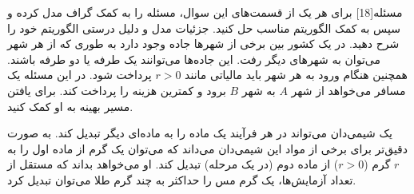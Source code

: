 ‌مسئله[18]
برای هر یک از قسمت‌های این سوال، مسئله را به کمک گراف مدل کرده و سپس به کمک الگوریتم مناسب حل کنید. جزئیات مدل و دلیل درستی الگوریتم خود را شرح دهید.
در یک کشور بین برخی از شهر‌ها جاده وجود دارد به طوری که از هر شهر می‌توان به شهر‌های دیگر رفت. این جاده‌ها می‌توانند یک طرفه یا دو طرفه باشند. همچنین هنگام ورود به هر شهر باید  مالیاتی  مانند $r > 0$    پرداخت شود. در این مسئله یک مسافر می‌خواهد از شهر $A$  به شهر $B$ برود و    کمترین هزینه را پرداخت کند. برای یافتن مسیر بهینه به او کمک کنید.




یک شیمی‌دان می‌تواند در هر فرآیند یک ماده را به ماده‌ای دیگر تبدیل کند. به صورت دقیق‌تر برای برخی از مواد این شیمی‌دان می‌داند که می‌توان یک گرم از ماده اول را به 
$r$
گرم ($r > 0$) از ماده دوم (در یک مرحله) تبدیل کند. او می‌خواهد بداند که مستقل از تعداد آزمایش‌ها، یک گرم مس را حداکثر به چند گرم طلا می‌توان تبدیل کرد.



